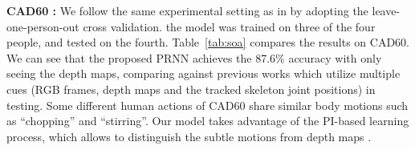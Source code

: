 \documentclass[10pt,twocolumn,letterpaper]{article}
\begin{document}
\noindent \textbf{CAD60 :} We follow the same experimental setting as in \cite{Jiang_tpami_2014,CVPR15_heterogeneous} by adopting the leave-one-person-out cross validation. \ie the model was trained on three of the four people, and tested on the fourth. Table~\ref{tab:soa} compares the results on CAD60.
We can see that the proposed PRNN achieves the 87.6\% accuracy with only seeing the depth maps, comparing against previous works which utilize multiple cues (\ie RGB frames, depth maps and the tracked skeleton joint positions)
in testing. Some different human actions of CAD60 share similar body motions such as ``chopping'' and ``stirring''. Our model takes advantage of the PI-based learning process, which allows to distinguish the subtle motions from depth maps \cite{Chengcheng_aaai_2014}.
\end{document}
